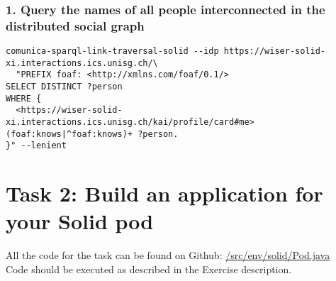 \documentclass[11pt]{article}
\begin{document}
\subsubsection*{1. Query the names of all people interconnected in the distributed social graph}
\begin{lstlisting}
comunica-sparql-link-traversal-solid --idp https://wiser-solid-xi.interactions.ics.unisg.ch/\
  "PREFIX foaf: <http://xmlns.com/foaf/0.1/>
SELECT DISTINCT ?person
WHERE {
  <https://wiser-solid-xi.interactions.ics.unisg.ch/kai/profile/card#me> (foaf:knows|^foaf:knows)+ ?person.
}" --lenient 
\end{lstlisting}
\section*{Task 2: Build an application for your Solid pod}
All the code for the task can be found on Github: \href{https://github.com/KaiTries/exercise-4/blob/main/src/env/solid/Pod.java}{/src/env/solid/Pod.java}\\
Code should be executed as described in the Exercise  description.
\end{document}
